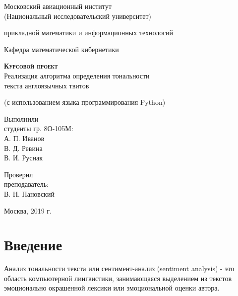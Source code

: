 \documentclass[14pt,a4paper]{scrartcl}
\begin{document}
\begin{titlepage}
  \begin{center}
    \large
    \vspace{1cm}
 
    Московский авиационный институт\\ (Национальный исследовательский университет)
    \vspace{0,5cm}
     
     прикладной математики и информационных технологий
     
    Кафедра математической кибернетики
    \vfill
 
    \textsc{\LARGE\textbf{Курсовой проект}}\\[5mm]
     
    {\Large Реализация алгоритма определения тональности \\текста англоязычных твитов}
  \bigskip
     
    (с использованием языка программирования Python)
\end{center}
\vfill
 
\newlength{\ML}
\hfill\begin{minipage}{0.3\textwidth}
  Выполнили\\ студенты гр. 8О-105М:\\
  А. П. Иванов \\В. Д. Ревина\\ В. И. Руснак
\end{minipage}%
\bigskip
 
\hfill\begin{minipage}{0.3\textwidth}
  Проверил\\ преподаватель:\\
  В. Н. Пановский
\end{minipage}%
\vfill
 
\begin{center}
  Москва, 2019 г.
\end{center}
\end{titlepage}
\tableofcontents
\newpage
\section{Введение}

Анализ тональности текста или сентимент-анализ (sentiment analysis) - это область компьютерной лингвистики, занимающаяся выделением из текстов эмоционально окрашенной лексики или эмоциональной оценки автора.
\end{document}
